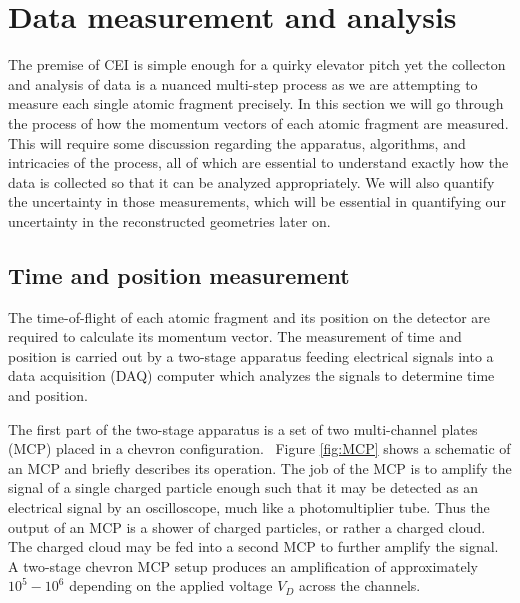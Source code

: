 \section{Data measurement and analysis}
The premise of CEI is simple enough for a quirky elevator pitch yet the collecton and analysis of data is a nuanced multi-step process as we are attempting to measure each single atomic fragment precisely. In this section we will go through the process of how the momentum vectors of each atomic fragment are measured. This will require some discussion regarding the apparatus, algorithms, and intricacies of the process, all of which are essential to understand exactly how the data is collected so that it can be analyzed appropriately. We will also quantify the uncertainty in those measurements, which will be essential in quantifying our uncertainty in the reconstructed geometries later on.

\subsection{Time and position measurement}
The time-of-flight of each atomic fragment and its position on the detector are required to calculate its momentum vector. The measurement of time and position is carried out by a two-stage apparatus feeding electrical signals into a data acquisition (DAQ) computer which analyzes the signals to determine time and position.

The first part of the two-stage apparatus is a set of two multi-channel plates (MCP) placed in a chevron configuration.\footnotemark~ Figure \ref{fig:MCP} shows a schematic of an MCP and briefly describes its operation. The job of the MCP is to amplify the signal of a single charged particle enough such that it may be detected as an electrical signal by an oscilloscope, much like a photomultiplier tube. Thus the output of an MCP is a shower of charged particles, or rather a charged cloud. The charged cloud may be fed into a second MCP to further amplify the signal. A two-stage chevron MCP setup produces an amplification of approximately $10^5-10^6$ depending on the applied voltage $V_D$ across the channels.


